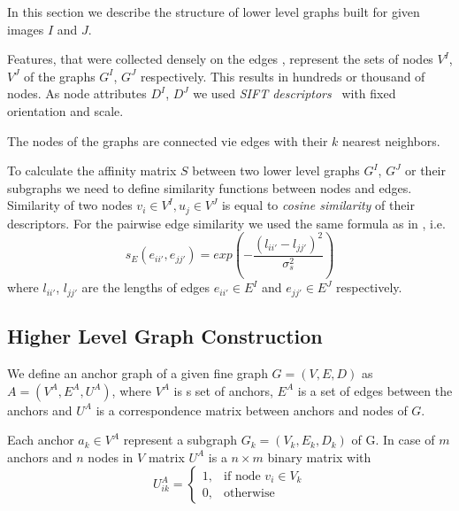 In this section we describe the structure of lower level graphs built for given images $I$ and $J$.

Features, that were collected densely on the edges \cite{PMT}, represent the sets of nodes $V^I$, $V^J$ of the graphs $G^I$, $G^J$ respectively. This results in hundreds or thousand of nodes. As node attributes $D^I$, $D^J$ we used \emph{SIFT descriptors}~\cite{Lowe2004} with fixed orientation and scale. 

The nodes of the graphs are connected vie edges with their $k$ nearest neighbors.

To calculate the affinity matrix $S$ between two lower level graphs  $G^I$, $G^J$ or their subgraphs we need to define similarity functions between nodes and edges. Similarity of two nodes $v_i\in V^I, u_j\in V^J$ is equal to \emph{cosine similarity} of their descriptors.
For the pairwise edge similarity we used the same formula as in \cite{Cho2014_Haystack, Suh_CVPR2015}, i.e.\ 
\begin{equation}
s_E(e_{ii\prime}, e_{jj\prime}) = exp(-\frac{(l_{ii\prime} - l_{jj\prime})^2}{\sigma^2_{s}})
\label{eq:s_e}
\end{equation}
where $l_{ii\prime}$, $l_{jj\prime} $ are the lengths of edges $e_{ii\prime}\in E^I$ and $e_{jj\prime}\in E^J$ respectively.




\subsection{Higher Level Graph Construction}


We define an anchor graph of a given fine graph $G = (V,E,D)$ as $A = (V^A,E^A, U^A)$, where $V^A$ is s set of anchors, $E^{A}$ is a set of edges between the anchors and $U^{A}$ is a correspondence matrix between anchors and nodes of $G$.

Each anchor $a_k\in V^A$ represent a subgraph $G_k = (V_k,E_k, D_k)$ of G. In case of $m$ anchors and $n$ nodes in $V$  matrix $U^{A}$ is a $n\times m$ binary matrix with 
$$U^{A}_{ik} = \begin{cases} 1, & \mbox{if node } v_i\in V_k    \\
	                         0, & \mbox{otherwise} \end{cases} $$	 
	                                                 
